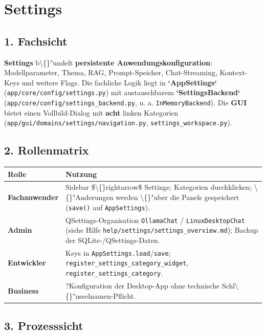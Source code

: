 \section{Settings}

\subsection{1. Fachsicht}

\textbf{Settings} b\textbackslash\{\}"undelt \textbf{persistente Anwendungskonfiguration}: Modellparameter, Thema, RAG, Prompt-Speicher, Chat-Streaming, Kontext-Keys und weitere Flags. Die fachliche Logik liegt in \textbf{`AppSettings`} (\texttt{app/core/config/settings.py}) mit austauschbarem \textbf{`SettingsBackend`} (\texttt{app/core/config/settings\_backend.py}, u. a. \texttt{InMemoryBackend}). Die \textbf{GUI} bietet einen Vollbild-Dialog mit \textbf{acht} linken Kategorien (\texttt{app/gui/domains/settings/navigation.py}, \texttt{settings\_workspace.py}).

\subsection{2. Rollenmatrix}

\begin{center}
\begin{tabular}{ll}
\hline
Rolle & Nutzung \\
\hline
\textbf{Fachanwender} & Sidebar \$\textbackslash\{\}rightarrow\$ Settings; Kategorien durchklicken; \textbackslash\{\}"Anderungen werden \textbackslash\{\}"uber die Panels gespeichert (\texttt{save()} auf \texttt{AppSettings}). \\
\textbf{Admin} & QSettings-Organisation \texttt{OllamaChat} / \texttt{LinuxDesktopChat} (siehe Hilfe \texttt{help/settings/settings\_overview.md}); Backup der SQLite-/QSettings-Daten. \\
\textbf{Entwickler} & Keys in \texttt{AppSettings.load}/\texttt{save}; \texttt{register\_settings\_category\_widget}, \texttt{register\_settings\_category}. \\
\textbf{Business} & ?Konfiguration der Desktop-App\texttt{} ohne technische Schl\textbackslash\{\}"usselnamen-Pflicht. \\
\hline
\end{tabular}
\end{center}

\subsection{3. Prozesssicht}

